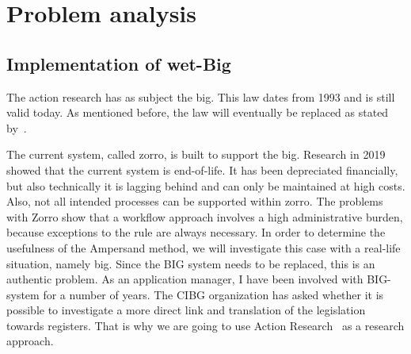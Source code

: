 \section{Problem analysis} \label{problem_analysis}
\subsection{Implementation of wet-Big} \label{implementation_wetbig}
The action research has as subject the \acrlong{big}.
This law dates from 1993 and is still valid today.
As mentioned before, the law will eventually be replaced as stated by~.

The current system, called \acrshort{zorro}, is built to support the \acrshort{big}.
Research in 2019 showed that the current system is end-of-life.
It has been depreciated financially, but also technically it is lagging behind and can only be maintained at high costs.
Also, not all intended processes can be supported within \acrshort{zorro}.
The problems with Zorro show that a workflow approach involves a high administrative burden, because exceptions to the rule are always necessary.
In order to determine the usefulness of the Ampersand method, we will investigate this case with a real-life situation, namely \acrshort{big}.
Since the BIG system needs to be replaced, this is an authentic problem.  
As an application manager, I have been involved with BIG-system for a number of years.  
The CIBG organization has asked whether it is possible to investigate a more direct link and translation of the legislation towards registers. 
That is why we are going to use Action Research~\citep{Easterbrook} as a research approach.


